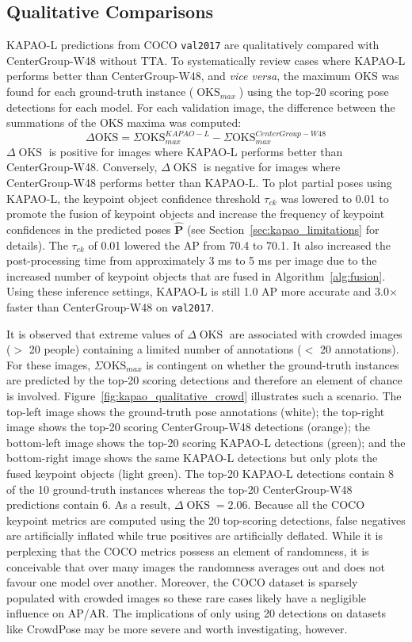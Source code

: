 \documentclass[runningheads]{llncs}
\DeclareMathOperator*{\oks}{OKS}
\begin{document}
\subsection{Qualitative Comparisons}
\label{sec:kapao_qualitative}
KAPAO-L predictions from COCO \texttt{val2017} are qualitatively compared with CenterGroup-W48 without TTA. To systematically review cases where KAPAO-L performs better than CenterGroup-W48, and \textit{vice versa}, the maximum OKS was found for each ground-truth instance ($\oks_{max}$) using the top-20 scoring pose detections for each model. For each validation image, the difference between the summations of the OKS maxima was computed:
\begin{equation}
\Delta\mathrm{OKS} = \Sigma\mathrm{OKS}_{max}^{KAPAO-L} - \Sigma\mathrm{OKS}_{max}^{CenterGroup-W48}
\end{equation}
$\Delta\oks$ is positive for images where KAPAO-L performs better than CenterGroup-W48. Conversely, $\Delta\oks$ is negative for images where CenterGroup-W48 performs better than KAPAO-L. To plot partial poses using KAPAO-L, the keypoint object confidence threshold $\tau_{ck}$ was lowered to 0.01 to promote the fusion of keypoint objects and increase the frequency of keypoint confidences in the predicted poses $\hat{\mathbf{P}}$ (see Section~\ref{sec:kapao_limitations} for details). The $\tau_{ck}$ of 0.01 lowered the AP from 70.4 to 70.1. It also increased the post-processing time from approximately 3 ms to 5 ms per image due to the increased number of keypoint objects that are fused in Algorithm~\ref{alg:fusion}. Using these inference settings, KAPAO-L is still 1.0 AP more accurate and 3.0$\times$ faster than CenterGroup-W48 on \texttt{val2017}. 

It is observed that extreme values of $\Delta\oks$ are associated with crowded images ($>$ 20 people) containing a limited number of annotations ($<$ 20 annotations). For these images, $\Sigma\mathrm{OKS}_{max}$ is contingent on whether the ground-truth instances are predicted by the top-20 scoring detections and therefore an element of chance is involved. 
Figure~\ref{fig:kapao_qualitative_crowd} illustrates such a scenario. The top-left image shows the ground-truth pose annotations (white); the top-right image shows the top-20 scoring CenterGroup-W48 detections (orange); the bottom-left image shows the top-20 scoring KAPAO-L detections (green); and the bottom-right image shows the same KAPAO-L detections but only plots the fused keypoint objects (light green). The top-20 KAPAO-L detections contain 8 of the 10 ground-truth instances whereas the top-20 CenterGroup-W48 predictions contain 6. As a result, $\Delta\oks = 2.06$. Because all the COCO keypoint metrics are computed using the 20 top-scoring detections, false negatives are artificially inflated while true positives are artificially deflated. While it is perplexing that the COCO metrics possess an element of randomness, it is conceivable that over many images the randomness averages out and does not favour one model over another. Moreover, the COCO dataset is sparsely populated with crowded images so these rare cases likely have a negligible influence on AP/AR. The implications of only using 20 detections on datasets like CrowdPose may be more severe and worth investigating, however.
\end{document}
